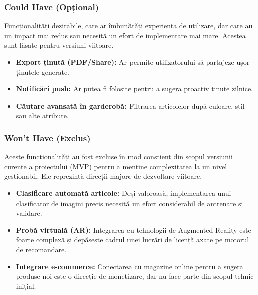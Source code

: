 \subsubsection{Could Have (Opțional)}
Funcționalități dezirabile, care ar îmbunătăți experiența de utilizare, dar care au un impact mai redus sau necesită un efort de implementare mai mare. Acestea sunt lăsate pentru versiuni viitoare.
\begin{itemize}
    \item \textbf{Export ținută (PDF/Share):} Ar permite utilizatorului să partajeze ușor ținutele generate.
    \item \textbf{Notificări push:} Ar putea fi folosite pentru a sugera proactiv ținute zilnice.
    \item \textbf{Căutare avansată în garderobă:} Filtrarea articolelor după culoare, stil sau alte atribute.
\end{itemize}

\subsubsection{Won't Have (Exclus)}
Aceste funcționalități au fost excluse în mod conștient din scopul versiunii curente a proiectului (MVP) pentru a menține complexitatea la un nivel gestionabil. Ele reprezintă direcții majore de dezvoltare viitoare.
\begin{itemize}
    \item \textbf{Clasificare automată articole:} Deși valoroasă, implementarea unui clasificator de imagini precis necesită un efort considerabil de antrenare și validare.
    \item \textbf{Probă virtuală (AR):} Integrarea cu tehnologii de Augmented Reality este foarte complexă și depășește cadrul unei lucrări de licență axate pe motorul de recomandare.
    \item \textbf{Integrare e-commerce:} Conectarea cu magazine online pentru a sugera produse noi este o direcție de monetizare, dar nu face parte din scopul tehnic inițial.
\end{itemize}



